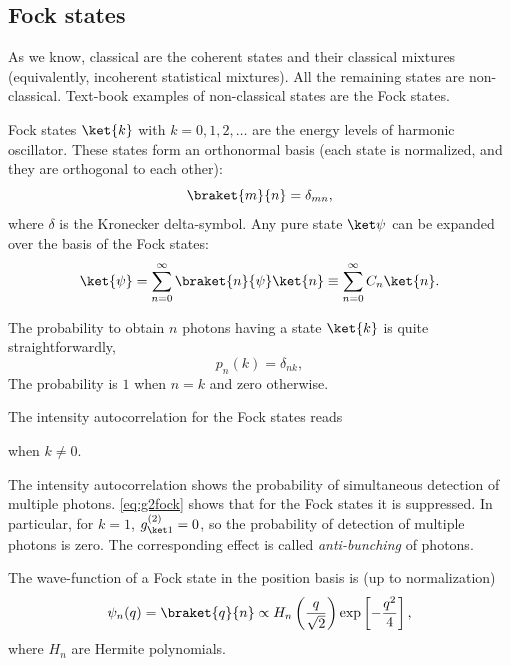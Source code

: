 \documentclass[fontsize=9pt,bookmarkpackage=false]{scrartcl}
\newcommand*{\mybx}[1]{\colorbox{mygr!15}{\hspace{1em}#1\hspace{1em}}}
\begin{document}
\subsection{Fock states} %
\label{sec:fock_states}

As we know, classical are the coherent states and their classical mixtures (equivalently, incoherent statistical mixtures).
All the remaining states are non-classical.
Text-book examples of non-classical states are the Fock states.

Fock states $\ket{k}$ with $k = 0,1,2,\dots$ are the energy levels of harmonic oscillator.
These states form an orthonormal basis (each state is normalized, and they are orthogonal to each other):
\begin{equation}
  \braket{ m }{ n } = \delta_{mn },
\end{equation}
where $\delta$ is the Kronecker delta-symbol.
Any pure state $\ket \psi$ can be expanded over the basis of the Fock states:
\begin{equation}
  \ket{ \psi } = \sum_{n = 0}^\infty \braket{ n }{ \psi } \ket{n }
  \equiv \sum_{n = 0}^\infty C_n \ket{ n }.
\end{equation}

The probability to obtain $n$ photons having a state $\ket{k}$ is quite straightforwardly,
\begin{equation}
  p_n (k) = \delta_{nk },
\end{equation}
The probability is $1$ when $n = k$ and zero otherwise.

The intensity autocorrelation for the Fock states reads
when $k \neq 0$.

The intensity autocorrelation shows the probability of simultaneous detection of multiple photons.
\cref{eq:g2fock} shows that for the Fock states it is suppressed.
In particular, for $k = 1$, $g^{(2)}_{\ket 1} = 0$, so the probability of detection of multiple photons is zero.
The corresponding effect is called \emph{anti-bunching} of photons.

The wave-function of a Fock state in the position basis is (up to normalization)
\begin{equation}
  \psi_n (q) = \braket{ q }{ n }
  \propto H_n \left( \frac{ q }{ \sqrt{ 2 }} \right)
  \exp\left[ - \frac{ q ^2 }{ 4 } \right],
\end{equation}
where $H_n$ are Hermite polynomials.
\end{document}
